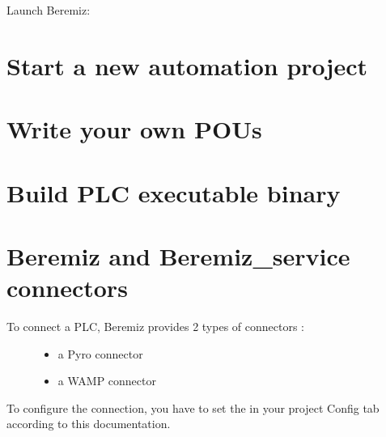 \documentclass[letterpaper,10pt,english]{sphinxmanual}
\begin{document}
Launch Beremiz:

%
\begin{sphinxVerbatim}[commandchars=\\\{\}]
 
 
\end{sphinxVerbatim}


\section{Start a new automation project}
\label{\detokenize{manual/start:start-a-new-automation-project}}\label{\detokenize{manual/start::doc}}

\section{Write your own POUs}
\label{\detokenize{manual/edit::doc}}\label{\detokenize{manual/edit:write-your-own-pous}}

\section{Build PLC executable binary}
\label{\detokenize{manual/build::doc}}\label{\detokenize{manual/build:build-plc-executable-binary}}

\section{Beremiz and Beremiz\_service connectors}
\label{\detokenize{manual/connectors:beremiz-and-beremiz-service-connectors}}\label{\detokenize{manual/connectors::doc}}\begin{description}
\item[{To connect a PLC, Beremiz provides 2 types of connectors :}] \leavevmode\begin{itemize}
\item {} 
a Pyro connector

\item {} 
a WAMP connector

\end{itemize}

\end{description}

To configure the connection, you have to set the  in your project Config tab according to this documentation.
\end{document}
